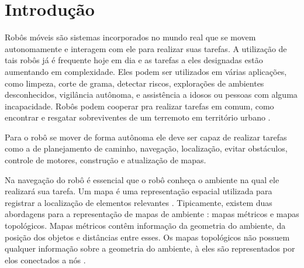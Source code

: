 \chapter{Introdu\c{c}\~ao}
\label{Introducao}

Robôs móveis são sistemas incorporados no mundo real que se movem autonomamente e interagem com ele para realizar suas tarefas\cite{construcaoMapas2}. 
	A utilização de tais robôs já é frequente hoje em dia e as tarefas a eles designadas estão aumentando em complexidade.
Eles podem ser utilizados em várias aplicações, como limpeza, corte de grama, detectar riscos, explorações de ambientes desconhecidos, 
vigilância autônoma, e assistência a idosos ou pessoas com alguma incapacidade. 
Robôs podem cooperar pra realizar tarefas em comum,
como encontrar e resgatar sobreviventes de um terremoto em território urbano \cite{mobileRobotEnergy}. 

Para o robô se mover de forma autônoma ele deve ser capaz de realizar tarefas como a de planejamento de caminho, navegação, localização, 
evitar obstáculos, controle de motores, construção e atualização de mapas.
	\begin{comment}
	Na navegação do robô é ideal que ele possa mover-se de um ponto inicial, até a posição objetivo, com a capacidade de evitar obstáculos, 
	fazendo o melhor trajeto possível, levando em consideração fatores como a suavidade do trajeto, distância percorrida, energia dispendida e segurança.
	
	O planejamento de movimentos deve levar em consideração fatores como a representação geométrica do ambiente, do modelo de movimento do robô, suavidade do trajeto, 
	comprimento, entre outros. Os principais métodos utilizados na resolução do planejamento de movmentos são: \textit{roadmap}, 
	decomposição de células, e campo potencial. Na maioria deles cria-se uma estrutura especial e aplica-se algoritmos de 
	 busca em grafos como A* \cite{dlite} e Dijkstra\cite{voronoi}.
	\end{comment}
	
	Na navegação do robô é essencial que o robô conheça o ambiente na qual ele realizará sua tarefa. 
Um mapa é uma representação espacial utilizada para registrar a localização de elementos relevantes \cite{construcaoMapas2}.
Tipicamente, existem duas abordagens para a representação de mapas de ambiente \cite{construcaoMapas}:
 mapas métricos e mapas topológicos. Mapas métricos contêm informação da
 geometria do ambiente, da posição dos objetos e distâncias entre esses. Os mapas
topológicos não possuem qualquer informação sobre a geometria do ambiente, à eles são
representados por elos conectados a nós \cite{construcaoMapas}. 

